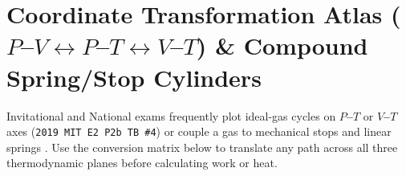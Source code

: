 \section{Coordinate Transformation Atlas ($P$--$V \leftrightarrow P$--$T \leftrightarrow V$--$T$) \& Compound Spring/Stop Cylinders}\label{sec:07.8}

Invitational and National exams frequently plot ideal-gas cycles on \textbf{$P$--$T$} or \textbf{$V$--$T$} axes (\texttt{2019 MIT E2 P2b TB \#4}) or couple a gas to mechanical stops and linear springs . Use the conversion matrix below to translate any path across all three thermodynamic planes before calculating work or heat.

